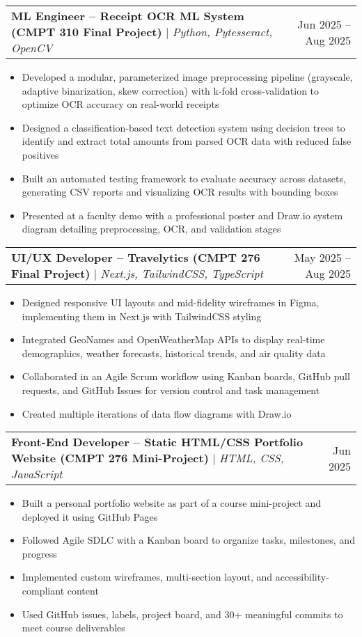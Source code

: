 \documentclass[letterpaper,10pt]{article}
\makeatletter
\newcommand{\resumeItem}[1]{
  \item\small{
    {#1 \vspace{-2pt}}
  }
}
\newcommand{\resumeProjectHeading}[2]{
    \item
    \begin{tabular*}{0.97\textwidth}{l@{\extracolsep{\fill}}r}
      \small#1 & #2 \\
    \end{tabular*}\vspace{-7pt}
}
\newcommand{\resumeItemListStart}{\begin{itemize}}
\newcommand{\resumeItemListEnd}{\end{itemize}\vspace{-5pt}}
\makeatother
\begin{document}
   \resumeProjectHeading
  {\textbf{ML Engineer – Receipt OCR ML System (CMPT 310 Final Project)} $|$ \emph{Python, Pytesseract, OpenCV}}{Jun 2025 -- Aug 2025}
    \resumeItemListStart
      \resumeItem{Developed a modular, parameterized image preprocessing pipeline (grayscale, adaptive binarization, skew correction) with k-fold cross-validation to optimize OCR accuracy on real-world receipts}
      \resumeItem{Designed a classification-based text detection system using decision trees to identify and extract total amounts from parsed OCR data with reduced false positives}
      \resumeItem{Built an automated testing framework to evaluate accuracy across datasets, generating CSV reports and visualizing OCR results with bounding boxes}
      \resumeItem{Presented at a faculty demo with a professional poster and Draw.io system diagram detailing preprocessing, OCR, and validation stages}
    \resumeItemListEnd




  
    \resumeProjectHeading
  {\textbf{UI/UX Developer – Travelytics (CMPT 276 Final Project)} $|$ \emph{Next.js, TailwindCSS, TypeScript}}{May 2025 -- Aug 2025}
      \resumeItemListStart
        \resumeItem{Designed responsive UI layouts and mid-fidelity wireframes in Figma, implementing them in Next.js with TailwindCSS styling}
        \resumeItem{Integrated GeoNames and OpenWeatherMap APIs to display real-time demographics, weather forecasts, historical trends, and air quality data}
        \resumeItem{Collaborated in an Agile Scrum workflow using Kanban boards, GitHub pull requests, and GitHub Issues for version control and task management}
        \resumeItem{Created multiple iterations of data flow diagrams with Draw.io}
      \resumeItemListEnd


    
    

    \resumeProjectHeading
      {\textbf{Front-End Developer – Static HTML/CSS Portfolio Website (CMPT 276 Mini-Project)} $|$ \emph{HTML, CSS, JavaScript}}{Jun 2025}
      \resumeItemListStart
        \resumeItem{Built a personal portfolio website as part of a course mini-project and deployed it using GitHub Pages}
        \resumeItem{Followed Agile SDLC with a Kanban board to organize tasks, milestones, and progress}
        \resumeItem{Implemented custom wireframes, multi-section layout, and accessibility-compliant content}
        \resumeItem{Used GitHub issues, labels, project board, and 30+ meaningful commits to meet course deliverables}
    \resumeItemListEnd
\end{document}
